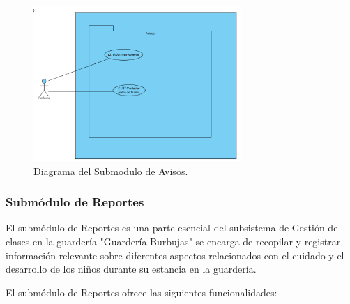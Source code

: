 \begin{figure}[htbp]
\centering
\includegraphics[width=0.7\textwidth]{images/arqui/subSisGestClasesAvis.png}
\caption{Diagrama del Submodulo de Avisos.}
\label{fig:subsistGestionClasesAvis}
\end{figure}

\subsubsection{Submódulo de Reportes}
El submódulo de Reportes es una parte esencial del subsistema de Gestión de clases en la guardería "Guardería Burbujas" se encarga de recopilar y registrar información relevante sobre diferentes aspectos relacionados con el cuidado y el desarrollo de los niños durante su estancia en la guardería.

El submódulo de Reportes ofrece las siguientes funcionalidades:


